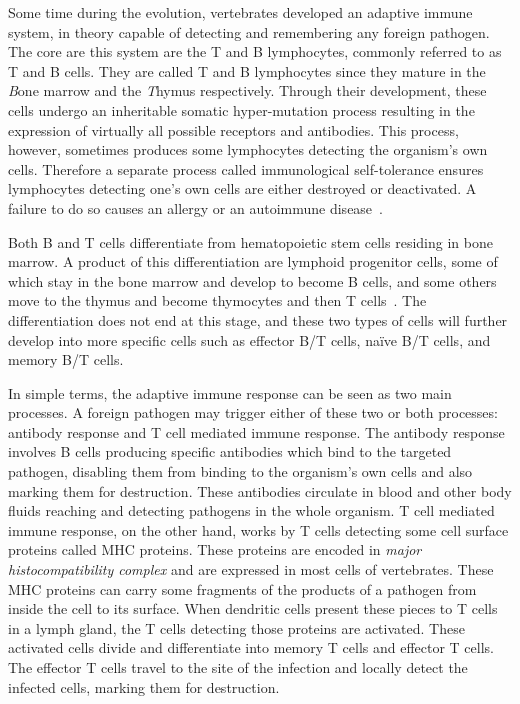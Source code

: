 Some time during the evolution, vertebrates developed an adaptive immune system, in theory capable of detecting and remembering any foreign pathogen. The core are this system are the T and B lymphocytes, commonly referred to as T and B cells. They are called T and B lymphocytes since they mature in the \emph{B}one marrow and the \emph{T}hymus respectively. Through their development, these cells undergo an inheritable somatic hyper-mutation process resulting in the expression of virtually all possible receptors and antibodies. This process, however, sometimes produces some lymphocytes detecting the organism's own cells. Therefore a separate process called immunological self-tolerance ensures lymphocytes detecting one's own cells are either destroyed or deactivated. A failure to do so causes an allergy or an autoimmune disease~\cite[Ch. 24]{the-cell}.

Both B and T cells differentiate from hematopoietic stem cells residing in bone marrow. A product of this differentiation are lymphoid progenitor cells, some of which stay in the bone marrow and develop to become B cells, and some others move to the thymus and become thymocytes and then T cells~\cite[Ch. 24]{the-cell}. The differentiation does not end at this stage, and these two types of cells will further develop into more specific cells such as effector B/T cells, na\"ive B/T cells, and memory B/T cells.

In simple terms, the adaptive immune response can be seen as two main processes. A foreign pathogen may trigger either of these two or both processes: antibody response and T cell mediated immune response. The antibody response involves B cells producing specific antibodies which bind to the targeted pathogen, disabling them from binding to the organism's own cells and also marking them for destruction. These antibodies circulate in blood and other body fluids reaching and detecting pathogens in the whole organism. T cell mediated immune response, on the other hand, works by T cells detecting some cell surface proteins called MHC proteins. These proteins are encoded in \emph{major histocompatibility complex} and are expressed in most cells of vertebrates. These MHC proteins can carry some fragments of the products of a pathogen from inside the cell to its surface. When dendritic cells present these pieces to T cells in a lymph gland, the T cells detecting those proteins are activated. These activated cells divide and differentiate into memory T cells and effector T cells. The effector T cells travel to the site of the infection and locally detect the infected cells, marking them for destruction.

